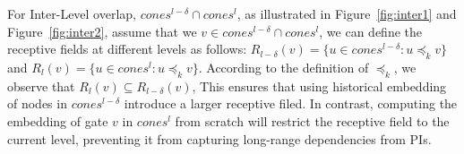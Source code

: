 For Inter-Level overlap, \ie $cones^{l-\delta} \cap cones^l$, as illustrated in Figure~\ref{fig:inter1} and Figure~\ref{fig:inter2}, assume that we $v\in cones^{l-\delta}\cap cones^l$, we can define the receptive fields at different levels as follows: $R_{l-\delta}(v)=\{u\in cones^{l-\delta}: u\preccurlyeq_k v\}$ and $R_{l}(v)=\{u\in cones^{l}: u \preccurlyeq_k v\}$. According to the definition of $\preccurlyeq_k$, we observe that $R_{l}(v)\subseteq R_{l-\delta}(v)$,  This ensures that using historical embedding of nodes in $cones^{l-\delta}$ introduce a larger receptive filed. In contrast, computing the embedding of gate $v$ in $cones^l$ from scratch will restrict the receptive field to the current level, preventing it from capturing long-range dependencies from PIs. 

\vspace{-10pt}

